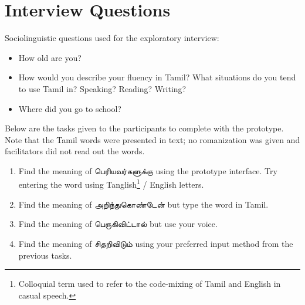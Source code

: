 \documentclass[11pt]{article}
\begin{document}





\appendix

\section{Interview Questions} \label{sec:appendix-a}
Sociolinguistic questions used for the exploratory interview:
\begin{itemize}
  \item How old are you?
  \item How would you describe your fluency in Tamil? What situations do you tend to use Tamil in? Speaking? Reading? Writing?
  \item Where did you go to school? 
\end{itemize}
Below are the tasks given to the participants to complete with the prototype. Note that the Tamil words were presented in text; no romanization was given and facilitators did not read out the words.\\
\begin{enumerate}
  \item Find the meaning of \foreignlanguage{tamil}{பெரியவர்களுக்கு} using the prototype interface. Try entering the word using Tanglish\footnote{Colloquial term used to refer to the code-mixing of Tamil and English in casual speech.} / English letters.
  \item Find the meaning of \newline \foreignlanguage{tamil}{அறிந்துகொண்டேன்} but type the word in Tamil.
  \item Find the meaning of \foreignlanguage{tamil}{பெருகிவிட்டால்} but use your voice. 
  \item Find the meaning of \foreignlanguage{tamil}{சிதறிவிடும்} using your preferred input method from the previous tasks.
\end{enumerate}
\end{document}

